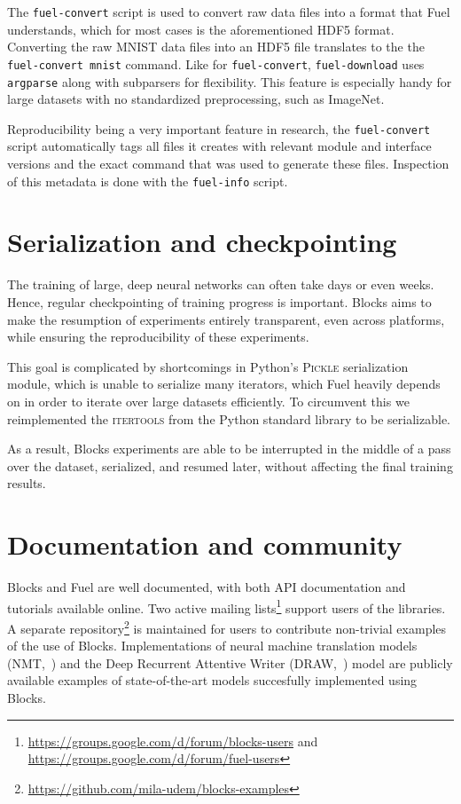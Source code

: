 \documentclass[twoside,11pt]{article}
\begin{document}
The \lstinline$fuel-convert$ script is used to convert raw data files into a
format that Fuel understands, which for most cases is the aforementioned HDF5
format. Converting the raw MNIST data files into an HDF5 file translates to the
the \lstinline$fuel-convert mnist$ command. Like for \lstinline$fuel-convert$,
\lstinline$fuel-download$ uses \lstinline$argparse$ along with subparsers for
flexibility. This feature is especially handy for large datasets with no
standardized preprocessing, such as ImageNet.

Reproducibility being a very important feature in research, the
\lstinline$fuel-convert$ script automatically tags all files it creates with
relevant module and interface versions and the exact command that was used to
generate these files. Inspection of this metadata is done with the
\lstinline$fuel-info$ script.

\section{Serialization and checkpointing}

The training of large, deep neural networks can often take days or even weeks.
Hence, regular checkpointing of training progress is important. Blocks aims to
make the resumption of experiments entirely transparent, even across platforms,
while ensuring the reproducibility of these experiments.

This goal is complicated by shortcomings in Python's \textsc{Pickle}
serialization module, which is unable to serialize many iterators, which Fuel
heavily depends on in order to iterate over large datasets efficiently. To
circumvent this we reimplemented the \textsc{itertools} from the Python
standard library to be serializable.

As a result, Blocks experiments are able to be interrupted in the middle of a
pass over the dataset, serialized, and resumed later, without affecting the
final training results.

\section{Documentation and community}

Blocks and Fuel are well documented, with both API documentation and tutorials
available online. Two active mailing
lists\footnote{\url{https://groups.google.com/d/forum/blocks-users} and
\url{https://groups.google.com/d/forum/fuel-users}} support users of the
libraries. A separate
repository\footnote{\url{https://github.com/mila-udem/blocks-examples}} is
maintained for users to contribute non-trivial examples of the use of Blocks.
Implementations of neural machine translation models
(NMT,~\cite{bahdanau2015neural}) and the Deep Recurrent Attentive Writer
(DRAW,~\cite{gregor2015draw}) model are publicly available examples of
state-of-the-art models succesfully implemented using Blocks.



\end{document}
